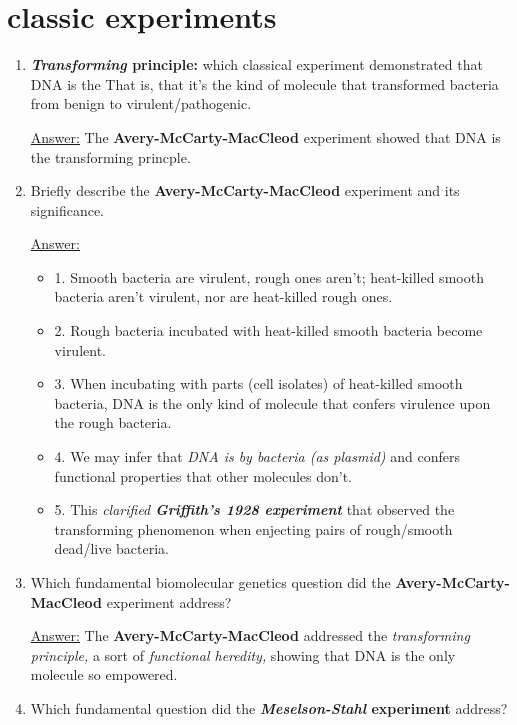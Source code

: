 \documentclass{article}
\newenvironment{QandA}{\begin{enumerate}[label=\bfseries Q\arabic*.]}
                       {\end{enumerate}}
\newenvironment{answered}{\par\normalfont\underline{Answer:}}{}
\begin{document}
\section{classic experiments}
\begin{QandA}
  \item{\textbf{\textit{Transforming} principle:} which classical experiment demonstrated that DNA is the  That is, that it's the kind of molecule that transformed bacteria from benign to virulent/pathogenic.}
    \begin{answered}
    The \textbf{Avery-McCarty-MacCleod} experiment showed that DNA is the transforming princple.
    \end{answered}
  \item{Briefly describe the \textbf{Avery-McCarty-MacCleod} experiment and its significance.}
    \begin{answered}
    \begin{itemize}
      \item{1. Smooth bacteria are virulent, rough ones aren't; heat-killed smooth bacteria aren't virulent, nor are heat-killed rough ones.}
      \item{2. Rough bacteria incubated with heat-killed smooth bacteria become virulent.}
      \item{3. When incubating with parts (cell isolates) of heat-killed smooth bacteria, DNA is the only kind of molecule that confers virulence upon the rough bacteria.}
      \item{4. We may infer that \textit{DNA is  by bacteria (as plasmid)} and confers functional properties that other molecules don't.}
      \item{5. This \textit{clarified \textbf{Griffith's 1928 experiment}} that observed the transforming phenomenon when enjecting pairs of rough/smooth dead/live bacteria.}
    \end{itemize}
    \end{answered}
  \item{Which fundamental biomolecular genetics question did the \textbf{Avery-McCarty-MacCleod} experiment address?}
    \begin{answered}
    The \textbf{Avery-McCarty-MacCleod} addressed the \textit{transforming principle,} a sort of \textit{functional heredity,} showing that DNA is the only molecule so empowered.
    \end{answered}
  \item{Which fundamental question did the \textbf{\textit{Meselson-Stahl} experiment} address?}

\end{QandA}
\end{document}
